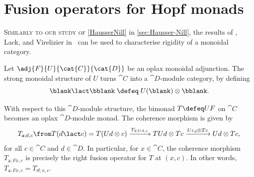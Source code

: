 \section{Fusion operators for Hopf monads}

\textsc{Similarly to our study of} \cref{HausserNill} in \cref{sec:Hausser-Nill},
the results of \Bruguieres, Lack, and Virelizier in~\cite{Bruguieres2011}
can be used to characterise rigidity of a monoidal category.

\begin{lemma}\label{delusion}
  Let \(\adj{F}{U}{\cat{C}}{\cat{D}}\) be an oplax monoidal adjunction.
  The strong monoidal structure of \(U\) turns \(\cat{C}\) into a \(\cat{D}\)\hyp{}module category, by defining
  \[
    \blank \lact \bblank \;\defeq\; U(\blank) \otimes \bblank.
  \]

  With respect to this \(\cat{D}\)\hyp{}module structure,
  the bimonad \(T \defeq UF\) on \(\cat{C}\) becomes an oplax \(\cat{D}\)\hyp{}module monad.
  The coherence morphism is given by
  \begin{equation}\label{confusion}
    T_{\mathsf{a};d,c} \from T(d \lact c) = T(Ud \otimes c)
    \xrightarrow{T_{2; Ud,c}} TUd \otimes Tc
    \xrightarrow{U\varepsilon_{d} \otimes Tc} Ud \otimes Tc,
  \end{equation}
  for all \(c \in \cat{C}\) and \(d \in \cat{D}\).
  In particular, for \(x \in \cat{C}\),
  the coherence morphism \(T_{\mathsf{a};Fx,c}\) is precisely the right fusion operator for \(T\) at \((x, c)\).
  In other words, \(T_{\mathsf{a};Fx,c} = T_{\mathsf{rf};x,c}\).
\end{lemma}
